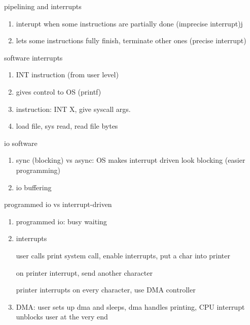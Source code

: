 \documentclass[11pt]{article}
\begin{document}
pipelining and interrupts
\begin{enumerate}
    \item interupt when some instructions are partially done (imprecise interrupt)j
    \item lets some instructions fully finish, terminate other ones (precise interrupt)
\end{enumerate}

software interrupts
\begin{enumerate}
    \item INT instruction (from user level)
    \item gives control to OS (printf)
    \item instruction: INT X, give syscall args.
    \item load file, sys read, read file bytes 
\end{enumerate}

io software
\begin{enumerate}
    \item sync (blocking) vs async: OS makes interrupt driven look blocking (easier programming)
    \item io buffering
\end{enumerate}

programmed io vs interrupt-driven
\begin{enumerate}
    \item programmed io: busy waiting
    \item interrupts

        user calls print system call, enable interrupts, put a char into printer

        on printer interrupt, send another character

        printer interrupts on every character, use DMA controller

    \item DMA: user sets up dma and sleeps, dma handles printing, CPU interrupt unblocks user at the very end
\end{enumerate}
\end{document}
